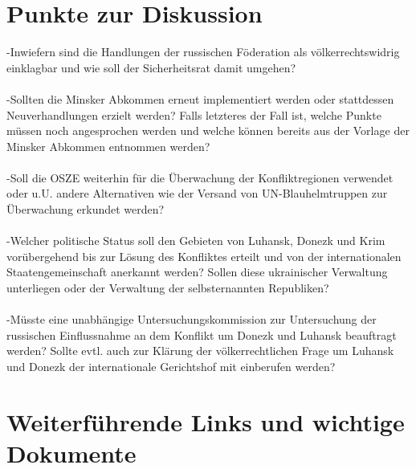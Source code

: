 \documentclass[a4paper,11pt]{article}
\begin{document}
    \section{Punkte zur Diskussion}
-Inwiefern sind die Handlungen der russischen Föderation als völkerrechtswidrig einklagbar und wie soll der Sicherheitsrat damit umgehen? \\ \\ -Sollten die Minsker Abkommen erneut implementiert werden oder stattdessen Neuverhandlungen erzielt werden? Falls letzteres der Fall ist, welche Punkte müssen noch angesprochen werden und welche können bereits aus der Vorlage der Minsker Abkommen entnommen werden? \\ \\ -Soll die OSZE weiterhin für die Überwachung der Konfliktregionen verwendet oder u.U. andere Alternativen wie der Versand von UN-Blauhelmtruppen zur Überwachung erkundet werden? \\ \\ -Welcher politische Status soll den Gebieten von Luhansk, Donezk und Krim vorübergehend bis zur Lösung des Konfliktes erteilt und von der internationalen Staatengemeinschaft anerkannt werden? Sollen diese ukrainischer Verwaltung unterliegen oder der Verwaltung der selbsternannten Republiken? \\ \\ -Müsste eine unabhängige Untersuchungskommission zur Untersuchung der russischen Einflussnahme an dem Konflikt um Donezk und Luhansk beauftragt werden? Sollte evtl. auch zur Klärung der völkerrechtlichen Frage um Luhansk und Donezk der internationale Gerichtshof mit einberufen werden? 



  \section{Weiterführende Links und wichtige Dokumente}
  
\end{document}
